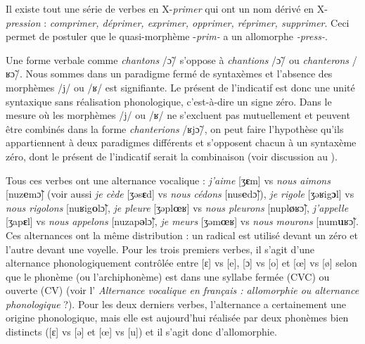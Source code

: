 {     Il existe tout une série de verbes en X-\textit{primer} qui ont un nom dérivé en X-\textit{pression} : \textit{comprimer, déprimer, exprimer, opprimer, réprimer, supprimer}. Ceci permet de postuler que le quasi-morphème -\textit{prim-} a un allomorphe \textit{{}-press-}.

     Une forme verbale comme \textit{chantons} /\~{ɔ}/ s’oppose à \textit{chantions} /\~{ɔ}/ ou \textit{chanterons} /ʁ\~{ɔ}/. Nous sommes dans un paradigme fermé de syntaxèmes et l’absence des morphèmes /j/ ou /ʁ/ est signifiante. Le présent de l’indicatif est donc une unité syntaxique sans réalisation phonologique, c’est-à-dire un signe zéro. Dans le mesure où les morphèmes  /j/ ou /ʁ/ ne s'excluent pas mutuellement et peuvent être combinés dans la forme \textit{chanterions} /ʁj\~{ɔ}/, on peut faire l'hypothèse qu'ils appartiennent à deux paradigmes différents et s'opposent chacun à un syntaxème zéro, dont le présent de l'indicatif serait la combinaison (voir discussion au ).

     Tous ces verbes ont une alternance vocalique : \textit{j’aime} [ʒ\textbf{ɛ}m] vs \textit{nous aimons} [nuz\textbf{e}m\~{ɔ}] (voir aussi \textit{je cède} [ʒǝs\textbf{ɛ}d] vs \textit{nous cédons} [nus\textbf{e}d\~{ɔ}]), \textit{je rigole} [ʒǝʁig\textbf{ɔ}l] vs \textit{nous rigolons} [nuʁig\textbf{o}l\~{ɔ}], \textit{je pleure} [ʒǝpl\textbf{œ}ʁ] vs \textit{nous pleurons} [nupl\textbf{ø}ʁ\~{ɔ}], \textit{j’appelle} [ʒap\textbf{ɛ}l] vs \textit{nous appelons} [nuzap\textbf{ǝ}l\~{ɔ}], \textit{je meurs} [ʒǝm\textbf{œ}ʁ] vs \textit{nous mourons} [num\textbf{u}ʁ\~{ɔ}]. Ces alternances ont la même distribution : un radical est utilisé devant un zéro et l’autre devant une voyelle. Pour les trois premiers verbes, il s’agit d’une alternance phonologiquement contrôlée entre [ɛ] vs [e], [ɔ] vs [o] et [œ] vs [ø] selon que le phonème (ou l’archiphonème) est dans une syllabe fermée (CVC) ou ouverte (CV) (voir l’ \textit{Alternance vocalique en français : allomorphie ou alternance phonologique} ?). Pour les deux derniers verbes, l’alternance a certainement une origine phonologique, mais elle est aujourd’hui réalisée par deux phonèmes bien distincts ([ɛ] vs [ǝ] et [œ] vs [u]) et il s’agit donc d’allomorphie.
    
}
